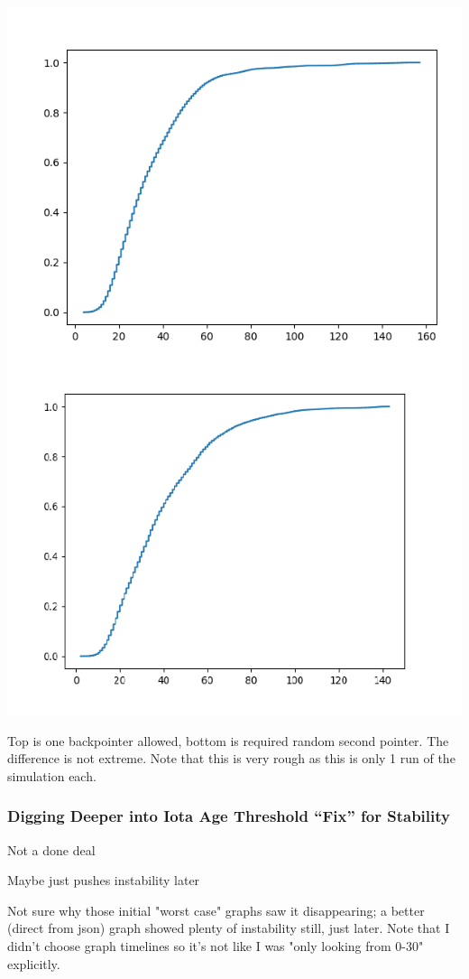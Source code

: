 \documentclass[letterpaper,11pt]{article}
\begin{document}
\includegraphics[scale=0.5]{iotaonebackvsrandom}

Top is one backpointer allowed, bottom is required random second pointer. The difference is not extreme. Note that this is very rough as this is only 1 run of the simulation each.

\subsubsection{Digging Deeper into Iota Age Threshold ``Fix'' for Stability}
Not a done deal

Maybe just pushes instability later

Not sure why those initial "worst case" graphs saw it disappearing; a better (direct from json) graph showed plenty of instability still, just later. Note that I didn't choose graph timelines so it's not like I was "only looking from 0-30" explicitly.
\end{document}
